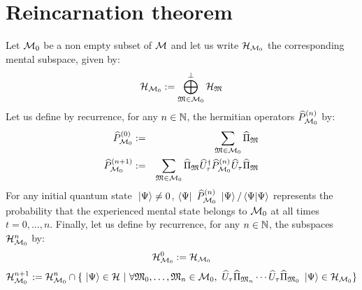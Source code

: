 \section{Reincarnation theorem}

 Let $\mathcal M_0$ be a non empty subset of $\mathcal M$ and let us write $\mathcal H_{\mathcal M_0}$ the corresponding mental subspace, given by:
\begin{equation*}
\mathcal H_{\mathcal M_0} := \bigoplus_{\mathfrak{M} \in \mathcal M_0}^\perp \mathcal H_{\mathfrak{M}}
\end{equation*}
Let us define by recurrence, for any $n \in \mathbb{N}$, the hermitian operators $\widehat{P}_{\mathcal M_0}^{(n)}$ by:
\begin{eqnarray*}
\widehat{P}_{\mathcal M_0}^{(0)} & := & \sum_{\mathfrak{M} \in \mathcal M_0} \widehat{\Pi}_{\mathfrak{M}} \\
\widehat{P}_{\mathcal M_0}^{(n+1)} & := & \sum_{\mathfrak{M} \in \mathcal M_0} \widehat{\Pi}_{\mathfrak{M}} \widehat{U}^{\dagger}_\tau \widehat{P}_{\mathcal M_0}^{(n)} \widehat{U}_\tau \widehat{\Pi}_{\mathfrak{M}}
\end{eqnarray*}
For any initial quantum state $\ \left|{\Psi}\right\rangle \neq 0$, $\left\langle{\Psi}\right|\  \widehat{P}_{\mathcal M_0}^{(n)} \ \left|{\Psi}\right\rangle / \left\langle{\Psi}|{\Psi}\right\rangle$ represents the probability that the experienced mental state belongs to $\mathcal M_0$ at all times $t = 0, \dotsc, n$. Finally, let us define by recurrence, for any $n \in \mathbb{N}$, the subspaces $\mathcal H_{\mathcal M_0}^n$ by:
\begin{equation*}
\mathcal H_{\mathcal M_0}^0 := \mathcal H_{\mathcal M_0}
\end{equation*}
\begin{equation*}
\mathcal H_{\mathcal M_0}^{n+1} := \mathcal H_{\mathcal M_0}^n \cap \{ \ \left|{\Psi}\right\rangle \in \mathcal H\ |\ \forall \mathfrak{M}_0, \dotsc, \mathfrak{M}_n \in \mathcal M_0,\ \widehat{U}_\tau \widehat{\Pi}_{\mathfrak{M}_n} \dotsm \widehat{U}_\tau \widehat{\Pi}_{\mathfrak{M}_0} \ \left|{\Psi}\right\rangle \in \mathcal H_{\mathcal M_0} \}
\end{equation*}





